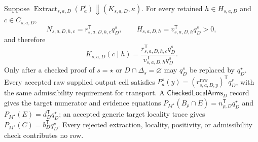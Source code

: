 Suppose \(\operatorname{Extract}_{s,a,D}(P_a^s)\Downarrow(K_{s,a,D},\kappa)\).  For every retained \(h\in H_{s,a,D}\) and \(c\in C_{s,a,D}\),
\[
N_{s,a,D,h,c}=r_{s,a,D,h,c}^{\mathsf T}q_D^s,
\qquad
H_{s,a,D,h}=v_{s,a,D,h}^{\mathsf T}q_D^s>0,
\]
and therefore
\[
K_{s,a,D}(c\mid h)=
\frac{r_{s,a,D,h,c}^{\mathsf T}q_D^s}
{v_{s,a,D,h}^{\mathsf T}q_D^s}.
\]
Only after a checked proof of \(s=\star\) or \(D\cap\Delta_s=\varnothing\) may \(q_D^s\) be replaced by \(q_D^\star\).  Every accepted raw supplied output cell satisfies \(P_a^s(y)=(r^{\mathrm{raw}}_{s,a,D,y})^{\mathsf T}q_D^s\), with the same admissibility requirement for transport.  A \(\mathsf{CheckedLocalArms}_D\) record gives the target numerator and evidence equations \(P_{M^\star}(B_\rho\cap E)=n_{\rho,D}^{\mathsf T}q_D^\star\) and \(P_{M^\star}(E)=d_D^{\mathsf T}q_D^\star\); an accepted generic target locality trace gives \(P_{M^\star}(C)=b_D^{\mathsf T}q_D^\star\).  Every rejected extraction, locality, positivity, or admissibility check contributes no row.